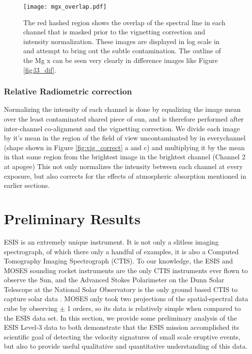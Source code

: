         
        
        
        
        \begin{figure}[htb!]
        	\centering
        	\texttt{[image: mgx\_overlap.pdf]}
        	\caption{The red hashed region shows the overlap of the \mgxbright spectral line in each channel that is masked prior to the vignetting correction and intensity normalization. These images are displayed in log scale in and attempt to bring out the subtle contamination.  The outline of the Mg {\sc x} can be seen very clearly in difference images like Figure \ref{fig:l3_dif}. }

        	\label{fig:mgx_overlap}
        \end{figure}
        
        
        
    \subsubsection{Relative Radiometric correction }
        
        Normalizing the intensity of each channel is done by equalizing the image mean over the least contaminated shared piece of sun, and is therefore performed after inter-channel co-alignment and the vignetting correction.
        We divide each image by it's mean in the region of the field of view uncontaminated by \mgxbright in everychannel (shape shown in Figure \ref{fig:vig_correct} a and c) and multiplying it by the mean in that same region from the brightest image in the brightest channel (Channel 2 at apogee)
        This not only normalizes the intensity between each channel at every exposure, but also corrects for the effects of atmospheric absorption mentioned in earlier sections. 

\section{Preliminary Results}

	   ESIS is an extremely unique instrument.  It is not only a slitless imaging spectrograph, of which there only a handful of examples, it is also a Computed Tomography Imaging Spectrograph (CTIS).  To our knowledge, the ESIS and MOSES sounding rocket instruments are the only CTIS instruments ever flown to observe the Sun, and  the Advanced Stokes Polarimeter on the Dunn Solar Telescope at the National Solar Observatory is the only ground based CTIS to capture solar data \citep{deforest2004}.  MOSES only took two projections of the spatial-spectral data cube by observing $\pm$ 1 orders, so its data is relatively simple when compared to the ESIS data set.   In this section, we provide some preliminary analysis of the ESIS Level-3 data to both demonstrate that the ESIS mission accomplished its scientific goal of detecting the velocity signatures of small scale eruptive events, but also to provide useful qualitative and quantitative understanding of this data.  
		
